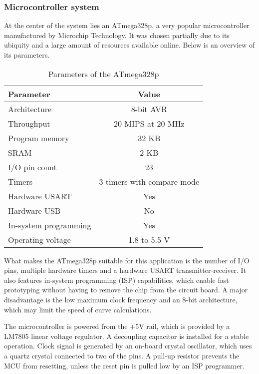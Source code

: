 \subsubsection{Microcontroller system}

At the center of the system lies an ATmega328p, a very popular microcontroller
manufactured by Microchip Technology. It was chosen partially due to its
ubiquity and a large amount of resources available online. Below is an overview
of its parameters.

\begin{table}[ht]
    \begin{center}
        \begin{tabular}{ |l|c| }
            \hline
            Parameter & Value \\
            \hline
            Architecture & 8-bit AVR \\
            Throughput & 20 MIPS at 20 MHz \\
            Program memory & 32 KB \\
            SRAM & 2 KB \\
            I/O pin count & 23 \\
            Timers & 3 timers with compare mode \\
            Hardware USART & Yes \\
            Hardware USB & No \\
            In-system programming & Yes \\
            Operating voltage & 1.8 to 5.5 V \\
            \hline
        \end{tabular}
        \caption{Parameters of the ATmega328p \cite{atmega328p}}
    \end{center}
\end{table}

What makes the ATmega328p suitable for this application is the number of I/O
pins, multiple hardware timers and a hardware USART transmitter-receiver.
It also features in-system programming (ISP) capabilities, which enable fast
prototyping without having to remove the chip from the circuit board. A major
disadvantage is the low maximum clock frequency and an 8-bit architecture, which
may limit the speed of curve calculations.

The microcontroller is powered from the +5V rail, which is provided by a LM7805
linear voltage regulator. A decoupling capacitor is installed for a stable
operation. Clock signal is generated by an on-board crystal oscillator, which
uses a quartz crystal connected to two of the pins. A pull-up resistor prevents
the MCU from resetting, unless the reset pin is pulled low by an ISP programmer.

